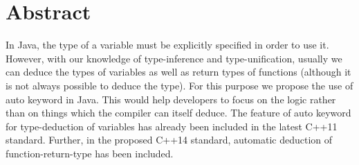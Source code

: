 \section{Abstract}
In Java, the type of a variable must be explicitly specified in order to use it. However, with our knowledge of type-inference and type-unification, usually we can deduce the types of variables as well as return types of functions (although it is not always possible to deduce the type). For this purpose we propose the use of auto keyword in Java. This would help developers to focus on the logic rather than on things which the compiler can itself deduce. The feature of auto keyword for type-deduction of variables has already been included in the latest C++11 standard. Further, in the proposed C++14 standard, automatic deduction of function-return-type has been included. 


%